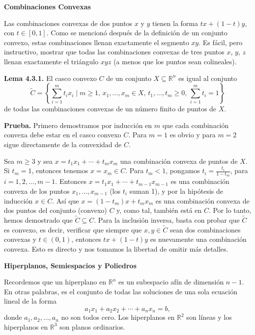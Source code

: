 \documentclass{article}
\begin{document}
\textbf{Combinaciones Convexas}

Las combinaciones convexas de dos puntos \( x \) y \( y \) tienen la forma \( tx + (1 - t)y \), con \( t \in [0, 1] \). Como se mencionó después de la definición de un conjunto convexo, estas combinaciones llenan exactamente el segmento \( xy \). Es fácil, pero instructivo, mostrar que todas las combinaciones convexas de tres puntos \( x \), \( y \), \( z \) llenan exactamente el triángulo \( xyz \) (a menos que los puntos sean colineales).

\textbf{Lema 4.3.1.} El casco convexo \( C \) de un conjunto \( X \subseteq \mathbb{R}^n \) es igual al conjunto
\[
\tilde{C} = \left\{ \sum_{i=1}^{m} t_i x_i \mid m \geq 1, \, x_1, \ldots, x_m \in X, \, t_1, \ldots, t_m \geq 0, \, \sum_{i=1}^{m} t_i = 1 \right\}
\]
de todas las combinaciones convexas de un número finito de puntos de \( X \).

\textbf{Prueba.} Primero demostramos por inducción en \( m \) que cada combinación convexa debe estar en el casco convexo \( C \). Para \( m = 1 \) es obvio y para \( m = 2 \) sigue directamente de la convexidad de \( C \).

Sea \( m \geq 3 \) y sea \( x = t_1 x_1 + \cdots + t_m x_m \) una combinación convexa de puntos de \( X \). Si \( t_m = 1 \), entonces tenemos \( x = x_m \in C \). Para \( t_m < 1 \), pongamos \( t_i = \frac{t_i}{1 - t_m} \), para \( i = 1, 2, \ldots, m - 1 \). Entonces \( x = t_1 x_1 + \cdots + t_{m-1} x_{m-1} \) es una combinación convexa de los puntos \( x_1, \ldots, x_{m-1} \) (los \( t_i \) suman 1), y por la hipótesis de inducción \( x \in C \). Así que \( x = (1 - t_m)x + t_m x_m \) es una combinación convexa de dos puntos del conjunto (convexo) \( C \) y, como tal, también está en \( C \). Por lo tanto, hemos demostrado que \( \tilde{C} \subseteq C \). Para la inclusión inversa, basta con probar que \( \tilde{C} \) es convexo, es decir, verificar que siempre que \( x, y \in \tilde{C} \) sean dos combinaciones convexas y \( t \in (0, 1) \), entonces \( tx + (1 - t)y \) es nuevamente una combinación convexa. Esto es directo y nos tomamos la libertad de omitir más detalles.

\textbf{Hiperplanos, Semiespacios y Poliedros}

Recordemos que un hiperplano en \( \mathbb{R}^n \) es un subespacio afín de dimensión \( n - 1 \). En otras palabras, es el conjunto de todas las soluciones de una sola ecuación lineal de la forma
\[
a_1 x_1 + a_2 x_2 + \cdots + a_n x_n = b,
\]
donde \( a_1, a_2, \ldots, a_n \) no son todos cero. Los hiperplanos en \( \mathbb{R}^2 \) son líneas y los hiperplanos en \( \mathbb{R}^3 \) son planos ordinarios.
\end{document}
